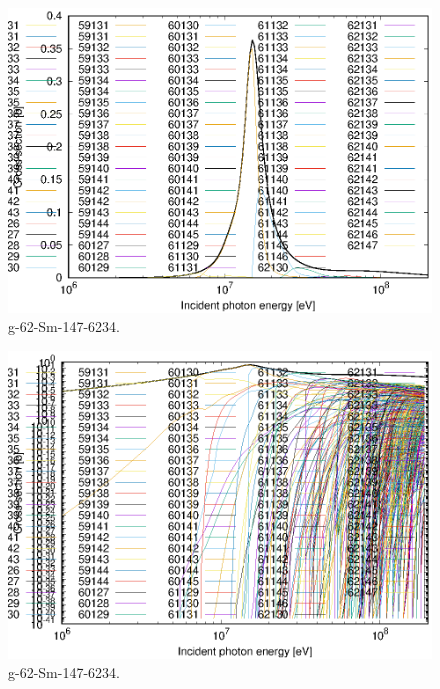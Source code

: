 \begin{figure}
 \includegraphics[width=\linewidth]{eps/g_62-Sm-147_6234.eps}
  \caption{g-62-Sm-147-6234.}
\end{figure}
\begin{figure}
 \includegraphics[width=\linewidth]{eps-log/g_62-Sm-147_6234.eps}
 \caption{g-62-Sm-147-6234.}
\end{figure}
\newpage \clearpage


